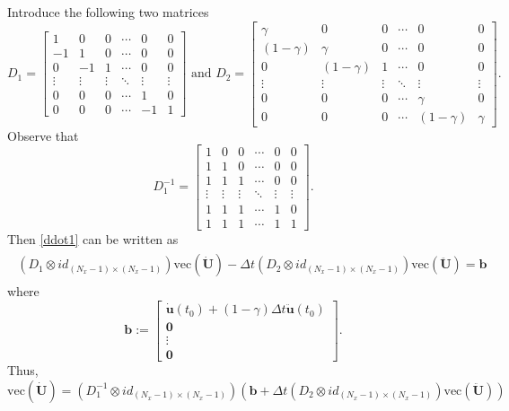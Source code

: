 \documentclass{ws-m3as}
\begin{document}



Introduce the following two matrices
$$
D_1 = \left[
\begin{array}{cccccc}
1 & 0 & 0 & \cdots & 0 & 0 \\
-1 & 1 & 0 & \cdots & 0 & 0 \\
0 & -1 & 1 & \cdots & 0 & 0 \\
\vdots & \vdots & \vdots & \ddots & \vdots & \vdots \\
0 & 0 & 0 & \cdots & 1 & 0 \\
0 & 0 & 0 & \cdots & -1 & 1  
\end{array}  
\right]
\text{ and } 
D_2 = \left[
\begin{array}{cccccc}
\gamma & 0 & 0 & \cdots & 0 & 0 \\
\left( 1-\gamma \right) & \gamma & 0 & \cdots & 0 & 0 \\
0 & \left( 1-\gamma\right) & 1 & \cdots & 0 & 0 \\
\vdots & \vdots & \vdots & \ddots & \vdots & \vdots \\
0 & 0 & 0 & \cdots & \gamma & 0 \\
0 & 0 & 0 & \cdots & \left(1-\gamma\right) & \gamma 
\end{array}  
\right].
$$
Observe that 
$$
D_1^{-1} = \left[
\begin{array}{cccccc}
1 & 0 & 0 & \cdots & 0 & 0 \\
1 & 1 & 0 & \cdots & 0 & 0 \\
1 & 1 & 1 & \cdots & 0 & 0 \\
\vdots & \vdots & \vdots & \ddots & \vdots & \vdots \\
1 & 1 & 1 & \cdots & 1 & 0 \\
1 & 1 & 1 & \cdots & 1 & 1  
\end{array}  
\right].
$$
Then \eqref{ddot1} can be written as
\begin{align}
\begin{array}{c}
\left( D_1 \otimes  id_{(N_x-1)\times(N_x-1)}\right) \mathrm{vec}(\dot{\mathbf{U}}) - \Delta t \left( D_2 \otimes  id_{(N_x-1)\times(N_x-1)}\right) \mathrm{vec}(\ddot{\mathbf{U}}) = \mathbf{b}
\end{array}\label{newmark2}
\end{align}
where
$$
\mathbf{b}:= \left[
\begin{array}{c}
\dot{\mathbf{u}}(t_0) + \left(1-\gamma\right)\Delta t\ddot{\mathbf{u}}(t_0) \\
\mathbf{0} \\
\vdots \\
\mathbf{0} 
\end{array}
\right].
$$
Thus,
$$
\mathrm{vec}(\dot{\mathbf{U}}) = \left( D_1^{-1} \otimes  id_{(N_x-1)\times(N_x-1)}\right)\left( \mathbf{b} +  \Delta t \left( D_2 \otimes  id_{(N_x-1)\times(N_x-1)}\right) \mathrm{vec}(\ddot{\mathbf{U}})\right)
$$
\end{document}
